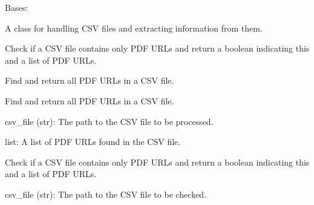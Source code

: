 \documentclass[letterpaper,10pt,english]{sphinxmanual}
\begin{document}
\begin{fulllineitems}
\label{\detokenize{postprocess:postprocess.CSVHandler}}
\pysigstartsignatures
{}
\pysigstopsignatures
\sphinxAtStartPar
Bases: 

\sphinxAtStartPar
A class for handling CSV files and extracting information from them.
\begin{description}
\begin{description}
\sphinxAtStartPar
Check if a CSV file contains only PDF URLs and return a boolean indicating this and a list of PDF URLs.

\sphinxAtStartPar
Find and return all PDF URLs in a CSV file.

\end{description}

\end{description}

\begin{fulllineitems}
\label{\detokenize{postprocess:postprocess.CSVHandler.find_all_pdf_urls}}
\pysigstartsignatures
{}
\pysigstopsignatures
\sphinxAtStartPar
Find and return all PDF URLs in a CSV file.
\begin{description}
\sphinxAtStartPar
csv\_file (str): The path to the CSV file to be processed.

\sphinxAtStartPar
list: A list of PDF URLs found in the CSV file.

\end{description}

\end{fulllineitems}


\begin{fulllineitems}
\label{\detokenize{postprocess:postprocess.CSVHandler.has_only_pdf_urls}}
\pysigstartsignatures
{}
\pysigstopsignatures
\sphinxAtStartPar
Check if a CSV file contains only PDF URLs and return a boolean indicating this and a list of PDF URLs.
\begin{description}
\sphinxAtStartPar
csv\_file (str): The path to the CSV file to be checked.


\end{description}
\end{fulllineitems}
\end{fulllineitems}
\end{document}
